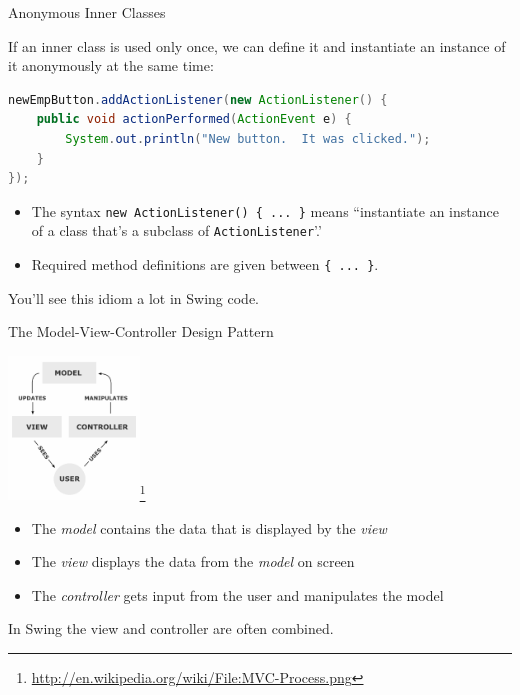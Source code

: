 \documentclass{beamer}
\begin{document}
\begin{frame}[fragile]{Anonymous Inner Classes}


If an inner class is used only once, we can define it and instantiate an instance of it anonymously at the same time:
\begin{lstlisting}[language=Java]
newEmpButton.addActionListener(new ActionListener() {
    public void actionPerformed(ActionEvent e) {
        System.out.println("New button.  It was clicked.");
    }
});
\end{lstlisting}

\begin{itemize}
\item The syntax {\tt new ActionListener() \{ ... \}} means ``instantiate an instance of a class that's a subclass of {\tt ActionListener}'.'
\item Required method definitions are given between {\tt \{ ... \}}.
\end{itemize}

You'll see this idiom a lot in Swing code.


\end{frame}

\begin{frame}[fragile]{The Model-View-Controller Design Pattern}
\vspace{-.1in}
\begin{center}
\includegraphics[height=1.5in]{MVC-Process.png}\footnote{\url{http://en.wikipedia.org/wiki/File:MVC-Process.png}}
\end{center}
\vspace{-.1in}
\begin{itemize}
\item The {\it model} contains the data that is displayed by the {\it view}
\item The {\it view} displays the data from the {\it model} on screen
\item The {\it controller} gets input from the user and manipulates the model
\end{itemize}
In Swing the view and controller are often combined.

\end{frame}
\end{document}
